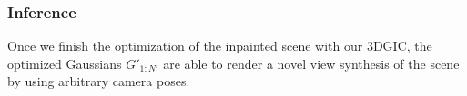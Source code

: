 \subsubsection{Inference}
Once we finish the optimization of the inpainted scene with our 3DGIC, the optimized Gaussians  $G'_{1:N'}$ are able to render a novel view synthesis of the scene by using arbitrary camera poses.  









